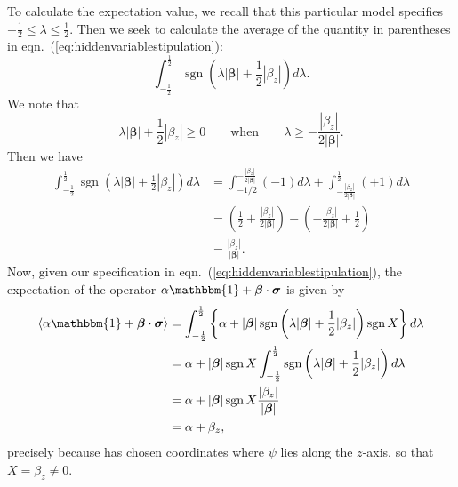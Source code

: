 \documentclass[12pt]{article}
\begin{document}
To calculate the expectation value, we recall that this particular model specifies $-\frac{1}{2} \le \lambda \le \frac{1}{2}$.  Then we seek to calculate the average of the quantity in parentheses in eqn.~(\ref{eq:hiddenvariablestipulation}):
\begin{displaymath}
  \int_{-\frac{1}{2}}^{\frac{1}{2}} \operatorname{sgn} \left( \lambda|\bm{\beta}| + \frac{1}{2} |\beta_z| \right) d\lambda.
\end{displaymath}
We note that
\begin{displaymath}
  \lambda|\bm{\beta}| + \frac{1}{2} |\beta_z| \ge 0 \qquad \text{when} \qquad \lambda \ge -\frac{|\beta_z|}{2|\bm{\beta}|}.
\end{displaymath}
Then we have
\begin{displaymath}
  \begin{split}
    \int_{-\frac{1}{2}}^{\frac{1}{2}} \operatorname{sgn} \left( \lambda|\bm{\beta}| + \frac{1}{2} |\beta_z| \right) d\lambda
    &= \int_{-1/2}^{-\frac{|\beta_z|}{2|\bm{\beta}|}} (-1) d\lambda + \int_{-\frac{|\beta_z|}{2|\bm{\beta}|}}^{\frac{1}{2}} (+1) d\lambda \\
    &= \left( \frac{1}{2} + \frac{|\beta_z|}{2|\bm{\beta}|} \right) - \left( -\frac{|\beta_z|}{2|\bm{\beta}|} + \frac{1}{2} \right) \\
    &= \frac{|\beta_z|}{|\bm{\beta}|}.
  \end{split}
\end{displaymath}
Now, given our specification in eqn.~(\ref{eq:hiddenvariablestipulation}), the expectation of the operator $\alpha \mathbbm{1} + \bm{\beta} \cdot \bm{\sigma}$ is given by
\begin{displaymath}
  \begin{split}
    \langle \alpha \mathbbm{1} + \bm{\beta} \cdot \bm{\sigma} \rangle
    &= \int_{-\frac{1}{2}}^{\frac{1}{2}} \left\{ \alpha + |\bm{\beta}| \operatorname{sgn} \left( \lambda|\bm{\beta}| + \frac{1}{2} |\beta_z| \right) \operatorname{sgn} X \right\} d\lambda \\
    &= \alpha + |\bm{\beta}| \operatorname{sgn} X \int_{-\frac{1}{2}}^{\frac{1}{2}} \operatorname{sgn} \left( \lambda|\bm{\beta}| + \frac{1}{2} |\beta_z| \right) d\lambda \\
    &= \alpha + |\bm{\beta}| \operatorname{sgn} X \frac{|\beta_z|}{|\bm{\beta}|} \\
    &= \alpha + \beta_z,
  \end{split}
\end{displaymath}
precisely because \cite{Bell1966} has chosen coordinates where $\psi$ lies along the $z$-axis, so that $X = \beta_z \not= 0$.
\end{document}
